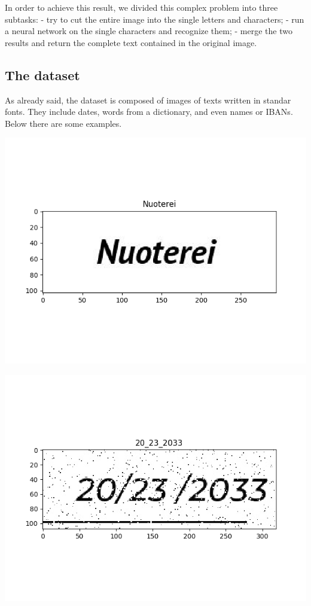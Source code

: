 \documentclass[11pt]{article}
\makeatletter
\def\maxwidth{\ifdim\Gin@nat@width>\linewidth\linewidth
    \else\Gin@nat@width\fi}
\let\Oldincludegraphics\includegraphics
\renewcommand{\includegraphics}[1]{\Oldincludegraphics[width=.8\maxwidth]{#1}}
\makeatother
\begin{document}
In order to achieve this result, we divided this complex problem into
three subtasks: - try to cut the entire image into the single letters
and characters; - run a neural network on the single characters and
recognize them; - merge the two results and return the complete text
contained in the original image.

\hypertarget{the-dataset}{%
\subsection{The dataset}\label{the-dataset}}

As already said, the dataset is composed of images of texts written in
standar fonts. They include dates, words from a dictionary, and even
names or IBANs. Below there are some examples.

\includegraphics{imgs/A1.png}

\includegraphics{imgs/A2.png}
\end{document}

